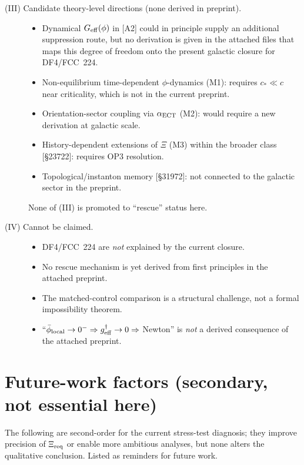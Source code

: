\documentclass[11pt]{article}
\begin{document}
\begin{description}
\item[(III) Candidate theory-level directions (none derived in preprint).]
\begin{itemize}
\item Dynamical $G_{\rm eff}(\phi)$ in [A2] could in principle supply
an additional suppression route, but no derivation is given in the
attached files that maps this degree of freedom onto the present
galactic closure for DF4/FCC~224.
\item Non-equilibrium time-dependent $\phi$-dynamics (M1): requires
$c_\ast\ll c$ near criticality, which is not in the current preprint.
\item Orientation-sector coupling via $\alpha_{\rm ECT}$ (M2): would
require a new derivation at galactic scale.
\item History-dependent extensions of $\Xi$ (M3) within the broader
class [\S23722]: requires OP3 resolution.
\item Topological/instanton memory [\S31972]: not connected to the
galactic sector in the preprint.
\end{itemize}
None of (III) is promoted to ``rescue'' status here.

\item[(IV) Cannot be claimed.]
\begin{itemize}
\item DF4/FCC~224 are \emph{not} explained by the current closure.
\item No rescue mechanism is yet derived from first principles in the
attached preprint.
\item The matched-control comparison is a structural challenge, not a
formal impossibility theorem.
\item ``$\bar\phi_{\rm local}\to 0^-\Rightarrow g^\dagger_{\rm eff}\to 0
\Rightarrow$ Newton'' is \emph{not} a derived consequence of the
attached preprint.
\end{itemize}
\end{description}

\section{Future-work factors (secondary, not essential here)}

The following are second-order for the current stress-test diagnosis;
they improve precision of $\Xi_{\rm req}$ or enable more ambitious
analyses, but none alters the qualitative conclusion. Listed as
reminders for future work.
\end{document}
